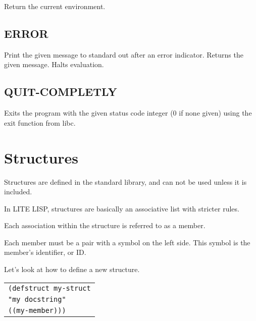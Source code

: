 \documentclass[
letterpaper,
oneside,
]{memoir}
\begin{document}
\noindent
Return the current environment.

\vspace{1em}

\section{ERROR}

\noindent
Print the given message to standard out after an error indicator. Returns the given message. Halts evaluation.

\vspace{1em}

\section{QUIT-COMPLETLY}

\noindent
Exits the program with the given status code integer (0 if none given) using the exit function from libc.

\vspace{1em}

\chapter{Structures}

Structures are defined in the standard library, and can not be used unless it is included.

\vspace{1em}
\noindent
In LITE LISP, structures are basically an associative list with stricter rules.

\vspace{1em}
\noindent
Each association within the structure is referred to as a member.

\vspace{1em}
\noindent
Each member must be a pair with a symbol on the left side. This symbol is the member’s identifier, or ID.

\vspace{1em}
\noindent
Let’s look at how to define a new structure.

\vspace{1em}
\begin{tabular}{l}
  \verb|(defstruct my-struct| \\
  \qquad\verb|"my docstring"| \\
  \qquad\verb|((my-member)))| \\
\end{tabular}
\vspace{1em}
\end{document}
